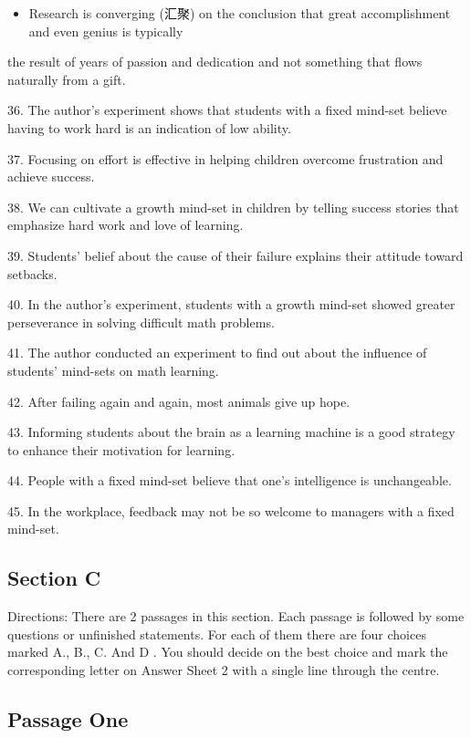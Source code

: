 \documentclass[UTF8,11pt]{ctexart}
\begin{document}
\begin{itemize}[leftmargin=2em,itemsep=.2em,topsep=.4em]\item[K.] Research is converging (汇聚) on the conclusion that great accomplishment and even genius is typically
\end{itemize}

the result of years of passion and dedication and not something that flows naturally from a gift.


36. The author's experiment shows that students with a fixed mind-set believe having to work hard is an indication of low ability.


37. Focusing on effort is effective in helping children overcome frustration and achieve success.


38. We can cultivate a growth mind-set in children by telling success stories that emphasize hard work and love of learning.


39. Students' belief about the cause of their failure explains their attitude toward setbacks.


40. In the author's experiment, students with a growth mind-set showed greater perseverance in solving difficult math problems.


41. The author conducted an experiment to find out about the influence of students' mind-sets on math learning.


42. After failing again and again, most animals give up hope.


43. Informing students about the brain as a learning machine is a good strategy to enhance their motivation for learning.


44. People with a fixed mind-set believe that one's intelligence is unchangeable.


45. In the workplace, feedback may not be so welcome to managers with a fixed mind-set.


\subsection*{\textbf{Section C}}


Directions: There are 2 passages in this section. Each passage is followed by some questions or unfinished statements. For each of them there are four choices marked A., B., C. And D . You should decide on the best choice and mark the corresponding letter on Answer Sheet 2 with a single line through the centre.


\subsection*{\textbf{Passage One}}
\end{document}
